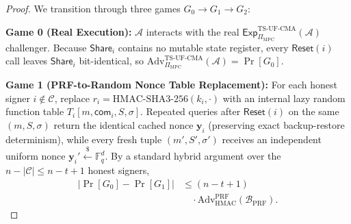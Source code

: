 \documentclass[conference,compsoc]{IEEEtran}
\begin{document}
\begin{proof}
We transition through three games $G_0 \to G_1 \to G_2$:

\textbf{Game 0 (Real Execution):} $\mathcal{A}$ interacts with the real $\mathsf{Exp}^{\mathrm{TS\text{-}UF\text{-}CMA}}_{\Pi_{\mathrm{MPC}}}(\mathcal{A})$ challenger. Because $\mathsf{Share}_i$ contains no mutable state register, every $\mathsf{Reset}(i)$ call leaves $\mathsf{Share}_i$ bit-identical, so $\mathrm{Adv}^{\mathrm{TS\text{-}UF\text{-}CMA}}_{\Pi_{\mathrm{MPC}}}(\mathcal{A}) = \Pr[G_0]$.

\textbf{Game 1 (PRF-to-Random Nonce Table Replacement):} For each honest signer $i \notin \mathcal{C}$, replace $r_i = \mathrm{HMAC\text{-}SHA3\text{-}256}(k_i, \cdot)$ with an internal lazy random function table $T_i[m, \mathsf{com}_i, S, \sigma]$. Repeated queries after $\mathsf{Reset}(i)$ on the same $(m, S, \sigma)$ return the identical cached nonce $\mathbf{y}_i$ (preserving exact backup-restore determinism), while every fresh tuple $(m', S', \sigma')$ receives an independent uniform nonce $\mathbf{y}_i' \xleftarrow{\$} \mathbb{F}_q^d$. By a standard hybrid argument over the $n - |\mathcal{C}| \le n - t + 1$ honest signers,
\begin{equation}
\begin{aligned}
|\Pr[G_0] - \Pr[G_1]|
  &\le (n - t + 1) \\
  &\quad \cdot \mathrm{Adv}^{\mathrm{PRF}}_{\mathrm{HMAC}}(\mathcal{B}_{\mathrm{PRF}}).
\end{aligned}
\end{equation}


\end{proof}
\end{document}
